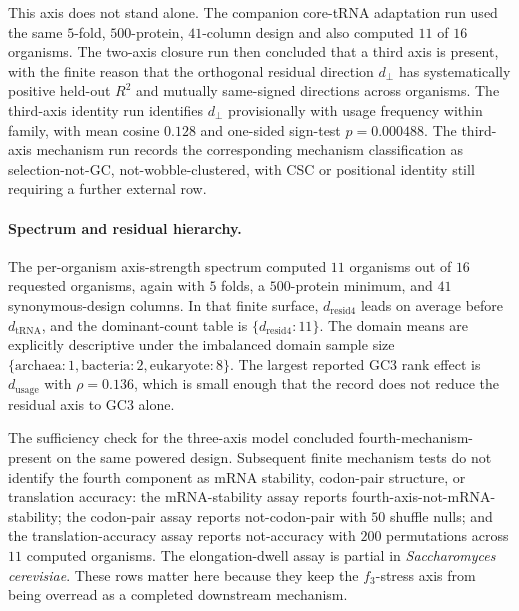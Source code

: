 This axis does not stand alone. The companion core-tRNA adaptation run used the same $5$-fold, $500$-protein, $41$-column design and also computed $11$ of $16$ organisms. The two-axis closure run then concluded that a third axis is present, with the finite reason that the orthogonal residual direction $d_{\perp}$ has systematically positive held-out $R^2$ and mutually same-signed directions across organisms. The third-axis identity run identifies $d_{\perp}$ provisionally with usage frequency within family, with mean cosine $0.128$ and one-sided sign-test $p=0.000488$. The third-axis mechanism run records the corresponding mechanism classification as selection-not-GC, not-wobble-clustered, with CSC or positional identity still requiring a further external row.

\paragraph{Spectrum and residual hierarchy.}
The per-organism axis-strength spectrum computed $11$ organisms out of $16$ requested organisms, again with $5$ folds, a $500$-protein minimum, and $41$ synonymous-design columns. In that finite surface, $d_{\mathrm{resid4}}$ leads on average before $d_{\mathrm{tRNA}}$, and the dominant-count table is $\{d_{\mathrm{resid4}}:11\}$. The domain means are explicitly descriptive under the imbalanced domain sample size $\{\mathrm{archaea}:1,\mathrm{bacteria}:2,\mathrm{eukaryote}:8\}$. The largest reported GC3 rank effect is $d_{\mathrm{usage}}$ with $\rho=0.136$, which is small enough that the record does not reduce the residual axis to GC3 alone.

The sufficiency check for the three-axis model concluded fourth-mechanism-present on the same powered design. Subsequent finite mechanism tests do not identify the fourth component as mRNA stability, codon-pair structure, or translation accuracy: the mRNA-stability assay reports fourth-axis-not-mRNA-stability; the codon-pair assay reports not-codon-pair with $50$ shuffle nulls; and the translation-accuracy assay reports not-accuracy with $200$ permutations across $11$ computed organisms. The elongation-dwell assay is partial in \emph{Saccharomyces cerevisiae}. These rows matter here because they keep the $f_3$-stress axis from being overread as a completed downstream mechanism.

